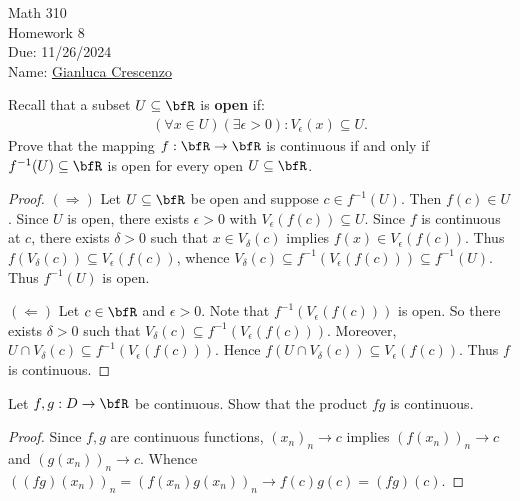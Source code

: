 \documentclass[11pt,twoside,openany]{memoir}
\begin{document}
\begin{center}
{\large Math 310 \\[0.1in]Homework 8 \\[0.1in]
Due: 11/26/2024}\\[.25in]
{Name:} {\underline{Gianluca Crescenzo\hspace*{2in}}}\\[0.15in]
\end{center}
\vspace{4pt}
    \begin{exercise}
        Recall that a subset $U \subseteq \bfR$ is \textbf{open} if:
            \begin{equation*}
            \begin{split}
                (\forall x \in U)(\exists \epsilon > 0):V_\epsilon(x) \subseteq U.
            \end{split}
            \end{equation*}
        Prove that the mapping $f:\bfR \rightarrow \bfR$ is continuous if and only if $f^{-1}(U) \subseteq \bfR$ is open for every open $U \subseteq \bfR$.
    \end{exercise}
        \begin{proof}
            $(\Rightarrow)$ Let $U \subseteq \bfR$ be open and suppose $c \in f^{-1}(U)$. Then $f(c) \in U$. Since $U$ is open, there exists $\epsilon > 0$ with $V_\epsilon(f(c)) \subseteq U$. Since $f$ is continuous at $c$, there exists $\delta > 0$ such that $x \in V_\delta(c)$ implies $f(x) \in V_\epsilon(f(c))$. Thus $f(V_\delta(c)) \subseteq V_\epsilon(f(c))$, whence $V_\delta(c) \subseteq f^{-1}(V_\epsilon(f(c))) \subseteq f^{-1}(U)$. Thus $f^{-1}(U)$ is open. \nl
            
            $(\Leftarrow)$ Let $c \in \bfR$ and $\epsilon > 0$. Note that $f^{-1}(V_\epsilon(f(c)))$ is open. So there exists $\delta > 0$ such that $V_\delta(c) \subseteq f^{-1}(V_\epsilon(f(c)))$. Moreover, $U \cap V_\delta(c) \subseteq f^{-1}(V_\epsilon(f(c)))$. Hence $f(U \cap V_\delta(c)) \subseteq V_\epsilon(f(c))$. Thus $f$ is continuous.
        \end{proof}
    \begin{exercise}
        Let $f,g:D \rightarrow \bfR$ be continuous. Show that the product $fg$ is continuous.
    \end{exercise}
        \begin{proof}
            Since $f,g$ are continuous functions, $(x_n)_n \rightarrow c$ implies $(f(x_n))_n \rightarrow c$ and $(g(x_n))_n \rightarrow c$. Whence $((fg)(x_n))_n = (f(x_n)g(x_n))_n \rightarrow f(c)g(c) = (fg)(c)$.
        \end{proof}
\end{document}
